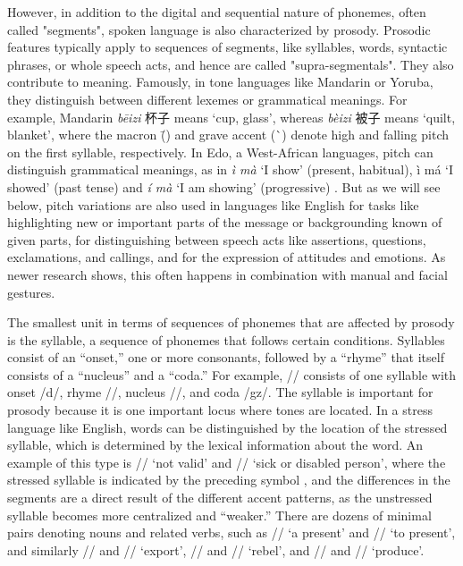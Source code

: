 However, in addition to the digital and sequential nature of phonemes, often called "segments", spoken language is also characterized by prosody. Prosodic features typically apply to sequences of segments, like syllables, words, syntactic phrases, or whole speech acts, and hence are called "supra-segmentals". They also contribute to meaning. Famously, in tone languages like Mandarin or Yoruba, they distinguish between different lexemes or grammatical meanings. For example, Mandarin \textit{b\=eizi} 杯子 means `cup, glass', whereas \textit{b\`eizi} 被子 means `quilt, blanket', where the macron (\={}) and grave accent (\`{}) denote high and falling pitch on the first syllable, respectively. In Edo, a West-African languages, pitch can distinguish grammatical meanings, as in \textit{ì mà} ‘I show’ (present, habitual), ì má ‘I showed’ (past tense) and \textit{í mà} ‘I am showing’ (progressive) \cite{ladefoged1975}. But as we will see below, pitch variations are also used in languages like English for tasks like highlighting new or important parts of the message or backgrounding known of given parts, for distinguishing between speech acts like assertions, questions, exclamations, and callings, and for the expression of attitudes and emotions. As newer research shows, this often happens in combination with manual and facial gestures. 

The smallest unit in terms of sequences of phonemes that are affected by prosody is the syllable, a sequence of phonemes that follows certain conditions. Syllables consist of an ``onset,'' one or more consonants, followed by a ``rhyme'' that itself consists of a ``nucleus'' and a ``coda.'' For example, // consists of one syllable with onset /d/, rhyme //, nucleus //, and coda /gz/. The syllable is important for prosody because it is one important locus where tones are located. In a stress language like English, words can be distinguished by the location of the stressed syllable, which is determined by the lexical information about the word. An example of this type is // `not valid' and // `sick or disabled person', where the stressed syllable is indicated by the preceding symbol , and the differences in the segments are a direct result of the different accent patterns, as the unstressed syllable becomes more centralized and ``weaker.'' There are dozens of minimal pairs denoting nouns and related verbs, such as // `a present' and // `to present', and similarly // and // `export', // and // `rebel', and // and // `produce'. 

